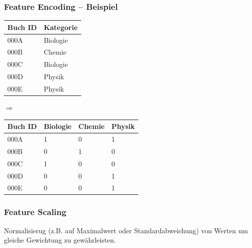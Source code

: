 \documentclass[aspectratio=169]{beamer}
\begin{document}
\begin{frame}
  \frametitle{Feature Encoding -- Beispiel}
  \begin{block}{}
    \vspace{0.5cm}
    \hspace{1cm}
    \begin{minipage}{0.3\textwidth}
      {\small
        \begin{tabular}{ll}
          \textbf{Buch ID} & \textbf{Kategorie}\\
          \hline
          000A & Biologie \\
          000B & Chemie \\
          000C & Biologie \\
          000D & Physik \\
          000E & Physik \\
        \end{tabular}
      }
    \end{minipage}
    \begin{minipage}{0.1\textwidth}
      $\Rightarrow$
    \end{minipage}
    \begin{minipage}{0.4\textwidth}
      {\small
        \begin{tabular}{llll}
          \textbf{Buch ID} & \textbf{Biologie} & \textbf{Chemie} & \textbf{Physik}\\
          \hline
          000A & 1 & 0 & 1\\
          000B & 0 & 1 & 0\\
          000C & 1 & 0 & 0\\
          000D & 0 & 0 & 1\\
          000E & 0 & 0 & 1\\
        \end{tabular}
      }
    \end{minipage}
    \hspace{1cm}
  \end{block}
\end{frame}  

\begin{frame}
  \frametitle{Feature Scaling}
  \begin{block}{}
    \begin{center}
      Normalisierug (z.B. auf Maximalwert oder Standardabweichung) von
      Werten um gleiche Gewichtung zu gewährleisten.
    \end{center}  
  \end{block}
\end{frame}
\end{document}
